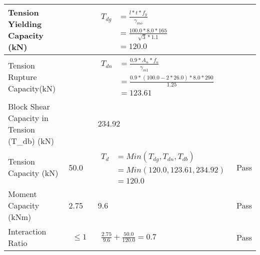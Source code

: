 \documentclass{article}%
\begin{document}
\begin{longtable}{|p{4cm}|p{5cm}|p{5.5cm}|p{1.5cm}|}
\hline%
Tension Yielding Capacity (kN)&&$\begin{aligned} T_{dg} &= \frac{l*t*f_y}{\gamma_{mo}}\\ &=\frac{100.0*8.0*165}{\sqrt{3}*1.1}\\ &=120.0\end{aligned}$&\\%
\hline%
Tension Rupture Capacity(kN)&&$\begin{aligned} T_{dn} &= \frac{0.9*A_{n}*f_u}{\gamma_{m1}}\\ &=\frac{0.9*(100.0-2*26.0)*8.0*290}{1.25}\\ &=123.61\end{aligned}$&\\%
\hline%
Block Shear Capacity in Tension (T\_db) (kN)&&234.92&\\%
\hline%
Tension Capacity (kN)&50.0&$\begin{aligned} T_d &= Min(T_{dg},T_{dn},T_{db})\\ &= Min(120.0,123.61,234.92)\\ &=120.0\end{aligned}$&Pass\\%
\hline%
Moment Capacity (kNm)&2.75&9.6&Pass\\%
\hline%
Interaction Ratio&$\begin{aligned} \leq1\end{aligned}$&$\begin{aligned} \frac{2.75}{9.6}+\frac{50.0}{120.0}=0.7\end{aligned}$&Pass\\%
\hline%
\end{longtable}

%
\end{document}
